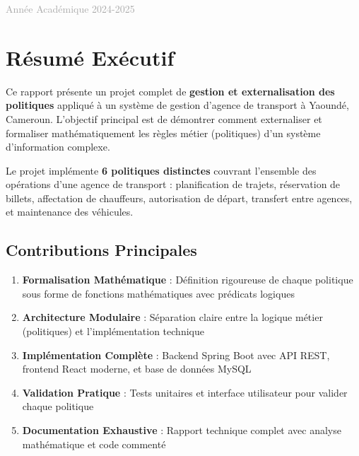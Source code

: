 \documentclass[12pt,a4paper]{article}
\begin{document}
\begin{titlepage}
        \vspace{0.5cm}


        {\large\textcolor{darkgray}{Année Académique 2024-2025}}\\[0.5cm]



        \vspace{0.5cm}
    \end{titlepage}
    \tableofcontents
    \newpage

    \section{Résumé Exécutif}

    \begin{tcolorbox}[colback=primaryblue!5,colframe=primaryblue,title=Vue d'Ensemble du Projet]
        Ce rapport présente un projet complet de \textbf{gestion et externalisation des politiques} appliqué à un système de gestion d'agence de transport à Yaoundé, Cameroun. L'objectif principal est de démontrer comment externaliser et formaliser mathématiquement les règles métier (politiques) d'un système d'information complexe.

        Le projet implémente \textbf{6 politiques distinctes} couvrant l'ensemble des opérations d'une agence de transport : planification de trajets, réservation de billets, affectation de chauffeurs, autorisation de départ, transfert entre agences, et maintenance des véhicules.
    \end{tcolorbox}

    \subsection{Contributions Principales}

    \begin{enumerate}[leftmargin=*]
        \item \textbf{Formalisation Mathématique} : Définition rigoureuse de chaque politique sous forme de fonctions mathématiques avec prédicats logiques
        \item \textbf{Architecture Modulaire} : Séparation claire entre la logique métier (politiques) et l'implémentation technique
        \item \textbf{Implémentation Complète} : Backend Spring Boot avec API REST, frontend React moderne, et base de données MySQL
        \item \textbf{Validation Pratique} : Tests unitaires et interface utilisateur pour valider chaque politique
        \item \textbf{Documentation Exhaustive} : Rapport technique complet avec analyse mathématique et code commenté
    \end{enumerate}
\end{document}
